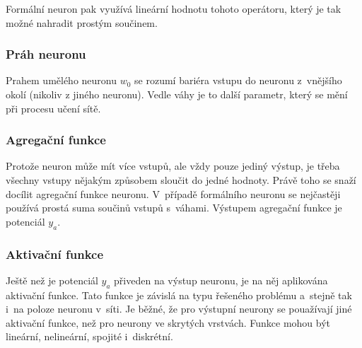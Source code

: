 \documentclass[a4paper,12pt]{article}
\begin{document}
{{Formální neuron pak využívá lineární hodnotu tohoto operátoru, který je tak možné nahradit prostým součinem.~\cite{nn}


\subsubsection{Práh neuronu}

Prahem umělého neuronu $w_0$ se rozumí bariéra vstupu do neuronu z~vnějšího okolí (nikoliv z jiného neuronu). Vedle váhy je to další parametr, který se mění při procesu učení sítě.~\cite{nn}

\subsubsection{Agregační funkce}

Protože neuron může mít více vstupů, ale vždy pouze jediný výstup, je třeba všechny vstupy nějakým způsobem sloučit do jedné hodnoty. Právě toho se snaží docílit agregační funkce neuronu. V~případě formálního neuronu se nejčastěji používá prostá suma součinů vstupů s~váhami. Výstupem agregační funkce je potenciál $y_a$.~\cite{nn}


\subsubsection{Aktivační funkce}

Ještě než je potenciál $y_a$ přiveden na výstup neuronu, je na něj aplikována aktivační funkce. Tato funkce je závislá na typu řešeného problému a~stejně tak i~na poloze neuronu v~síti. Je běžné, že pro výstupní neurony se pouažívají jiné aktivační funkce, než pro neurony ve skrytých vrstvách. Funkce mohou být lineární, nelineární, spojité i~diskrétní.~\cite{nn}





}}
\end{document}
